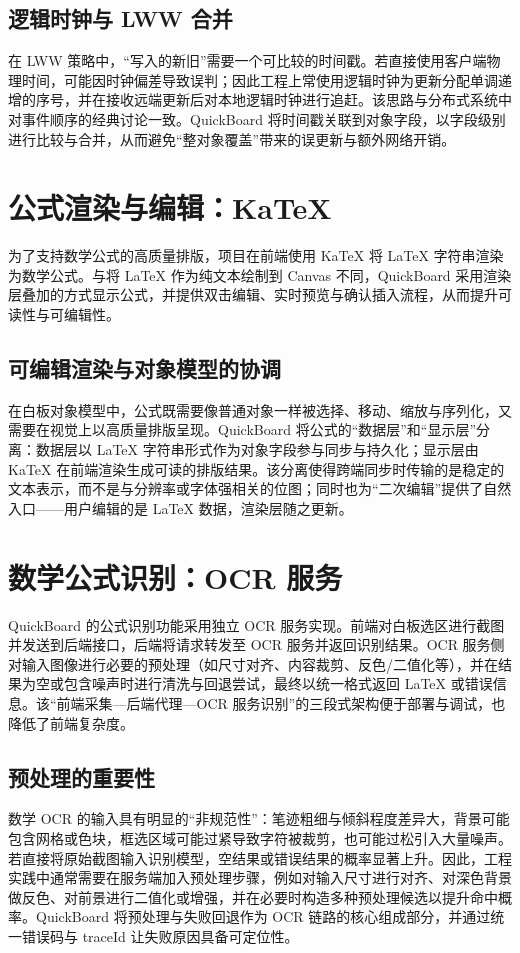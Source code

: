 \subsection{逻辑时钟与 LWW 合并}
在 LWW 策略中，“写入的新旧”需要一个可比较的时间戳。若直接使用客户端物理时间，可能因时钟偏差导致误判；因此工程上常使用逻辑时钟为更新分配单调递增的序号，并在接收远端更新后对本地逻辑时钟进行追赶。该思路与分布式系统中对事件顺序的经典讨论一致\cite{lamport_1978}。QuickBoard 将时间戳关联到对象字段，以字段级别进行比较与合并，从而避免“整对象覆盖”带来的误更新与额外网络开销。

\section{公式渲染与编辑：KaTeX}
为了支持数学公式的高质量排版，项目在前端使用 KaTeX 将 LaTeX 字符串渲染为数学公式。与将 LaTeX 作为纯文本绘制到 Canvas 不同，QuickBoard 采用渲染层叠加的方式显示公式，并提供双击编辑、实时预览与确认插入流程，从而提升可读性与可编辑性。\cite{katex}

\subsection{可编辑渲染与对象模型的协调}
在白板对象模型中，公式既需要像普通对象一样被选择、移动、缩放与序列化，又需要在视觉上以高质量排版呈现。QuickBoard 将公式的“数据层”和“显示层”分离：数据层以 LaTeX 字符串形式作为对象字段参与同步与持久化；显示层由 KaTeX 在前端渲染生成可读的排版结果。该分离使得跨端同步时传输的是稳定的文本表示，而不是与分辨率或字体强相关的位图；同时也为“二次编辑”提供了自然入口——用户编辑的是 LaTeX 数据，渲染层随之更新。

\section{数学公式识别：OCR 服务}
QuickBoard 的公式识别功能采用独立 OCR 服务实现。前端对白板选区进行截图并发送到后端接口，后端将请求转发至 OCR 服务并返回识别结果。OCR 服务侧对输入图像进行必要的预处理（如尺寸对齐、内容裁剪、反色/二值化等），并在结果为空或包含噪声时进行清洗与回退尝试，最终以统一格式返回 LaTeX 或错误信息。该“前端采集—后端代理—OCR 服务识别”的三段式架构便于部署与调试，也降低了前端复杂度。\cite{fastapi}

\subsection{预处理的重要性}
数学 OCR 的输入具有明显的“非规范性”：笔迹粗细与倾斜程度差异大，背景可能包含网格或色块，框选区域可能过紧导致字符被裁剪，也可能过松引入大量噪声。若直接将原始截图输入识别模型，空结果或错误结果的概率显著上升。因此，工程实践中通常需要在服务端加入预处理步骤，例如对输入尺寸进行对齐、对深色背景做反色、对前景进行二值化或增强，并在必要时构造多种预处理候选以提升命中概率。QuickBoard 将预处理与失败回退作为 OCR 链路的核心组成部分，并通过统一错误码与 traceId 让失败原因具备可定位性。

